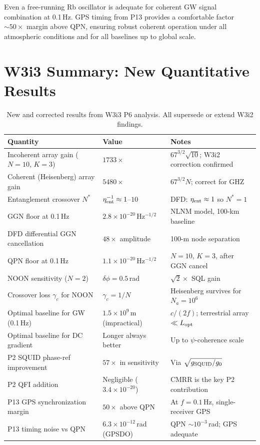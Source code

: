 \documentclass[11pt]{article}
\theoremstyle{definition}
\theoremstyle{remark}
\begin{document}
Even a free-running Rb oscillator is adequate for coherent GW signal
combination at 0.1\,Hz. GPS timing from P13 provides a comfortable factor
$\sim 50\times$ margin above QPN, ensuring robust coherent operation under
all atmospheric conditions and for all baselines up to global scale.

\section{W3i3 Summary: New Quantitative Results}

\begin{table}[h]
\centering
\caption{New and corrected results from W3i3 P6 analysis. All supersede
or extend W3i2 findings.}
\begin{tabular}{@{}p{6cm}ll@{}}
\toprule
Quantity & Value & Notes \\
\midrule
Incoherent array gain ($N=10$, $K=3$) & $1733\times$ & $67^{3/2}\sqrt{10}$; W3i2 correction confirmed \\
Coherent (Heisenberg) array gain & $5480\times$ & $67^{3/2} N$; correct for GHZ \\
Entanglement crossover $N^*$ & $\eta_{\rm ent}^{-1} \approx 1$--$10$ & DFD: $\eta_{\rm ent}\approx 1$ so $N^*=1$ \\
GGN floor at 0.1\,Hz & $2.8\times10^{-20}$\,Hz$^{-1/2}$ & NLNM model, 100-km baseline \\
DFD differential GGN cancellation & $48\times$ amplitude & 100-m node separation \\
QPN floor at 0.1\,Hz & $1.1\times10^{-20}$\,Hz$^{-1/2}$ & $N=10$, $K=3$, after GGN cancel \\
NOON sensitivity ($N=2$) & $\delta\phi = 0.5$\,rad & $\sqrt{2}\times$ SQL gain \\
Crossover loss $\gamma_c$ for NOON & $\gamma_c = 1/N$ & Heisenberg survives for $N_a=10^6$ \\
Optimal baseline for GW (0.1\,Hz) & $1.5\times10^9$\,m (impractical) & $c/(2f)$; terrestrial array $\ll L_{\rm opt}$ \\
Optimal baseline for DC gradient & Longer always better & Up to $\psi$-coherence scale \\
P2 SQUID phase-ref improvement & $57\times$ in sensitivity & Via $\sqrt{g_{\rm SQUID}/g_0}$ \\
P2 QFI addition & Negligible ($3.4\times10^{-20}$) & CMRR is the key P2 contribution \\
P13 GPS synchronization margin & $50\times$ above QPN & At $f=0.1$\,Hz, single-receiver GPS \\
P13 timing noise vs QPN & $6.3\times10^{-12}$\,rad (GPSDO) & QPN $\sim 10^{-3}$\,rad; GPS adequate \\
\bottomrule
\end{tabular}
\end{table}
\end{document}

